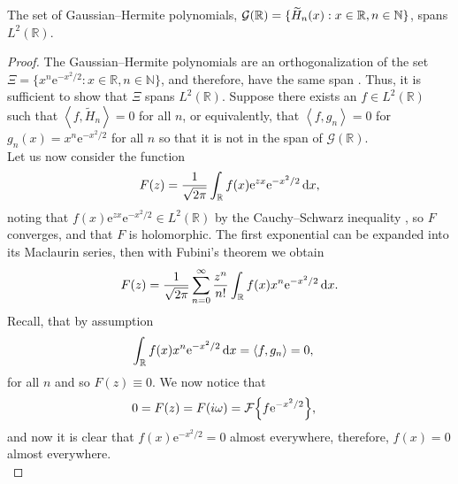 \begin{theorem}
\label{thm:hermite}
The set of Gaussian--Hermite polynomials, $\mathcal{G}(\mathbb{R}) = \{ \Her{n}{x} : x \in \mathbb{R}, n \in \mathbb{N} \}$, spans $L^2(\mathbb{R})$.
\end{theorem}
\begin{proof}
The Gaussian--Hermite polynomials are an orthogonalization of the set $\Xi = \{x^n \textrm{e}^{-x^2/2} : x \in \mathbb{R}, n \in \mathbb{N}\}$, and therefore, have the same span \cite{kreyszig, szego}. Thus, it is sufficient to show that $\Xi$ spans $L^2(\mathbb{R})$.
Suppose there exists an $f \in L^2(\mathbb{R})$ such that $\left< f, \widetilde{H}_n \right> = 0$ for all $n$, or equivalently, that $\left< f, g_n \right> = 0$ for $g_n(x) = x^n \textrm{e}^{-x^2/2}$ for all $n$ so that it is not in the span of $\mathcal{G}(\mathbb{R})$. \\

Let us now consider the function \cite{courant, szego, teuwen}
\begin{align*}
F(z) = \frac{1}{\sqrt{2\pi}}\int_\mathbb{R} f(x) \textrm{e}^{zx} \textrm{e}^{-x^2/2} \, \textrm{d} x,
\end{align*}
noting that $f(x) \textrm{e}^{zx} \textrm{e}^{-x^2/2} \in L^2(\mathbb{R})$ by the Cauchy--Schwarz inequality \cite{griffel, kolmogorov}, so $F$ converges, and that $F$ is holomorphic. The first exponential can be expanded into its Maclaurin series, then with Fubini's theorem we obtain
\begin{align*}
F(z) = \frac{1}{\sqrt{2\pi}} \sum_{n = 0}^{\infty} \frac{z^n}{n!} \int_\mathbb{R} f(x) x^n \textrm{e}^{-x^2/2} \, \textrm{d} x.
\end{align*}
Recall, that by assumption
\begin{align*}
\int_\mathbb{R} f(x) x^n \textrm{e}^{-x^2/2} \, \df x &= \left< f, g_n \right> = 0,
\end{align*}
for all $n$ and so $F(z) \equiv 0$. We now notice that
\begin{align*}
0 &= F(z) = F(i \omega) = \FT{f \textrm{e}^{-x^2/2}},
\end{align*}
and now it is clear that $f(x) \textrm{e}^{-x^2/2} = 0$ almost everywhere, therefore, $f(x) = 0$ almost everywhere. \\
\end{proof}

